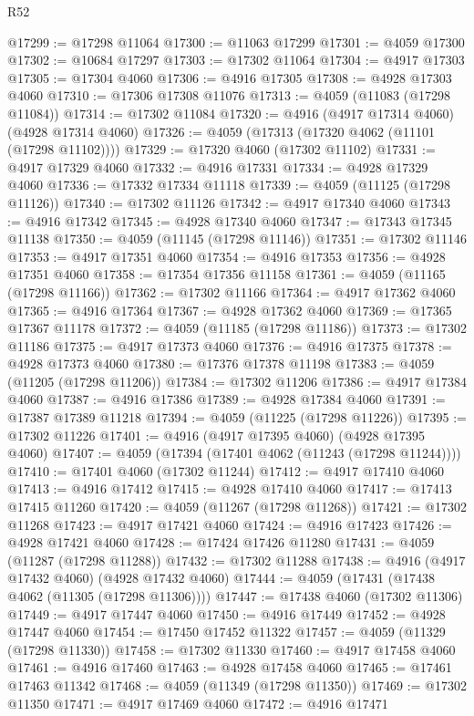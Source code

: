 \begin{lexlean}{R52}
\begin{coremodule}
@17299 := @17298 @11064
@17300 := @11063 @17299
@17301 := @4059 @17300
@17302 := @10684 @17297
@17303 := @17302 @11064
@17304 := @4917 @17303
@17305 := @17304 @4060
@17306 := @4916 @17305
@17308 := @4928 @17303 @4060
@17310 := @17306 @17308 @11076
@17313 := @4059 (@11083 (@17298 @11084))
@17314 := @17302 @11084
@17320 := @4916 (@4917 @17314 @4060) (@4928 @17314 @4060)
@17326 := @4059 (@17313 (@17320 @4062 (@11101 (@17298 @11102))))
@17329 := @17320 @4060 (@17302 @11102)
@17331 := @4917 @17329 @4060
@17332 := @4916 @17331
@17334 := @4928 @17329 @4060
@17336 := @17332 @17334 @11118
@17339 := @4059 (@11125 (@17298 @11126))
@17340 := @17302 @11126
@17342 := @4917 @17340 @4060
@17343 := @4916 @17342
@17345 := @4928 @17340 @4060
@17347 := @17343 @17345 @11138
@17350 := @4059 (@11145 (@17298 @11146))
@17351 := @17302 @11146
@17353 := @4917 @17351 @4060
@17354 := @4916 @17353
@17356 := @4928 @17351 @4060
@17358 := @17354 @17356 @11158
@17361 := @4059 (@11165 (@17298 @11166))
@17362 := @17302 @11166
@17364 := @4917 @17362 @4060
@17365 := @4916 @17364
@17367 := @4928 @17362 @4060
@17369 := @17365 @17367 @11178
@17372 := @4059 (@11185 (@17298 @11186))
@17373 := @17302 @11186
@17375 := @4917 @17373 @4060
@17376 := @4916 @17375
@17378 := @4928 @17373 @4060
@17380 := @17376 @17378 @11198
@17383 := @4059 (@11205 (@17298 @11206))
@17384 := @17302 @11206
@17386 := @4917 @17384 @4060
@17387 := @4916 @17386
@17389 := @4928 @17384 @4060
@17391 := @17387 @17389 @11218
@17394 := @4059 (@11225 (@17298 @11226))
@17395 := @17302 @11226
@17401 := @4916 (@4917 @17395 @4060) (@4928 @17395 @4060)
@17407 := @4059 (@17394 (@17401 @4062 (@11243 (@17298 @11244))))
@17410 := @17401 @4060 (@17302 @11244)
@17412 := @4917 @17410 @4060
@17413 := @4916 @17412
@17415 := @4928 @17410 @4060
@17417 := @17413 @17415 @11260
@17420 := @4059 (@11267 (@17298 @11268))
@17421 := @17302 @11268
@17423 := @4917 @17421 @4060
@17424 := @4916 @17423
@17426 := @4928 @17421 @4060
@17428 := @17424 @17426 @11280
@17431 := @4059 (@11287 (@17298 @11288))
@17432 := @17302 @11288
@17438 := @4916 (@4917 @17432 @4060) (@4928 @17432 @4060)
@17444 := @4059 (@17431 (@17438 @4062 (@11305 (@17298 @11306))))
@17447 := @17438 @4060 (@17302 @11306)
@17449 := @4917 @17447 @4060
@17450 := @4916 @17449
@17452 := @4928 @17447 @4060
@17454 := @17450 @17452 @11322
@17457 := @4059 (@11329 (@17298 @11330))
@17458 := @17302 @11330
@17460 := @4917 @17458 @4060
@17461 := @4916 @17460
@17463 := @4928 @17458 @4060
@17465 := @17461 @17463 @11342
@17468 := @4059 (@11349 (@17298 @11350))
@17469 := @17302 @11350
@17471 := @4917 @17469 @4060
@17472 := @4916 @17471

\end{coremodule}
\end{lexlean}
